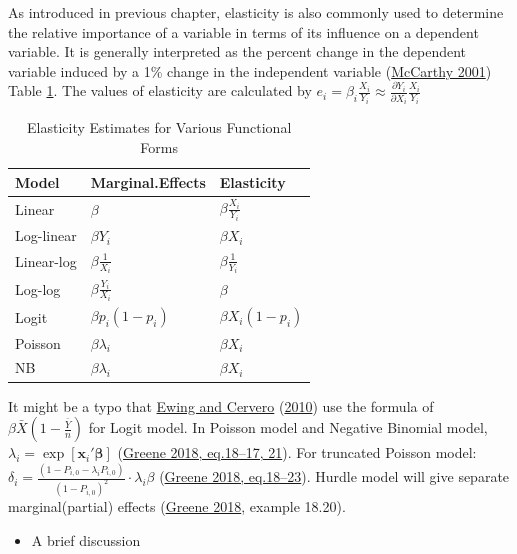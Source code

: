 \documentclass[
  11pt,
  openany]{memoir}
\providecommand{\tightlist}{%
  \setlength{\itemsep}{0pt}\setlength{\parskip}{0pt}}
\begin{document}
As introduced in previous chapter, elasticity is also commonly used to determine the relative importance of a variable in terms of its influence on a dependent variable. It is generally interpreted as the percent change in the dependent variable induced by a 1\% change in the independent variable (\protect\hyperlink{ref-mccarthyTransportationEconomicsTheory2001}{McCarthy 2001}) Table \ref{tab:elas-formula}.
The values of elasticity are calculated by \(e_i=\beta_i\frac{X_i}{Y_i}\approx\frac{\partial Y_i}{\partial X_i}\frac{X_i}{Y_i}\)

\begin{table}

\caption{\label{tab:elas-formula}Elasticity Estimates for Various Functional Forms}
\centering
\fontsize{7}{9}\selectfont
\begin{tabular}[t]{lll}
\toprule
Model & Marginal.Effects & Elasticity\\
\midrule
Linear & $\beta$ & $\beta\frac{X_i}{Y_i}$\\
Log-linear & $\beta Y_i$ & $\beta X_i$\\
Linear-log & $\beta\frac{1}{X_i}$ & $\beta\frac{1}{Y_i}$\\
Log-log & $\beta\frac{Y_i}{X_i}$ & $\beta$\\
Logit & $\beta p_i(1-p_i)$ & $\beta X_i(1-p_i)$\\
\addlinespace
Poisson & $\beta\lambda_{i}$ & $\beta X_i$\\
NB & $\beta \lambda_{i}$ & $\beta X_i$\\
\bottomrule
\end{tabular}
\end{table}

It might be a typo that \protect\hyperlink{ref-ewingTravelBuiltEnvironment2010}{Ewing and Cervero} (\protect\hyperlink{ref-ewingTravelBuiltEnvironment2010}{2010}) use the formula of \(\beta \bar X\left(1-\frac{\bar Y}{n}\right)\) for Logit model.
In Poisson model and Negative Binomial model, \(\lambda_i=\exp[\mathbf{x}_i'\boldsymbol{\beta}]\) (\protect\hyperlink{ref-greeneEconometricAnalysis2018}{Greene 2018, eq.18--17, 21}).
For truncated Poisson model: \(\delta_i=\frac{(1-P_{i,0}-\lambda_i P_{i,0})}{(1-P_{i,0})^2}\cdot\lambda_i\beta\) (\protect\hyperlink{ref-greeneEconometricAnalysis2018}{Greene 2018, eq.18--23}).
Hurdle model will give separate marginal(partial) effects (\protect\hyperlink{ref-greeneEconometricAnalysis2018}{Greene 2018}, example 18.20).

\begin{itemize}
\tightlist
\item
  A brief discussion
\end{itemize}
\end{document}
